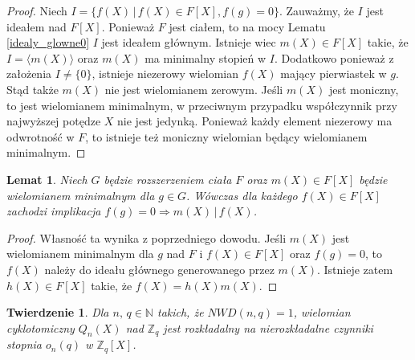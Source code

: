 \documentclass[declaration,shortabstract]{iithesis}
\theoremstyle{definition}
\theoremstyle{remark} \newtheorem{observation}{Obserwacja}
\theoremstyle{plain} \newtheorem{theorem}{Twierdzenie}
\theoremstyle{plain} \newtheorem{lemma}{Lemat}
\theoremstyle{remark} \newtheorem*{remark*}{Uwaga}
\theoremstyle{reminder} \newtheorem*{reminder*}{Przypomnienie}
\begin{document}
\begin{proof}
	Niech $I = \{f(X) \, | \, f(X) \in F[X], f(g) = 0\}$. Zauważmy, że $I$ jest ideałem nad $F[X]$. Ponieważ $F$ jest ciałem, to na mocy Lematu \ref{idealy_glowne0} $I$ jest ideałem głównym. Istnieje wiec $m(X) \in F[X]$ takie, że $I = \langle m(X) \rangle$ oraz $m(X)$ ma minimalny stopień w $I$. Dodatkowo ponieważ z założenia $I \neq \{0\}$, istnieje niezerowy wielomian $f(X)$ mający pierwiastek w $g$. Stąd także $m(X)$ nie jest wielomianem zerowym. Jeśli $m(X)$ jest moniczny, to jest wielomianem minimalnym, w przeciwnym przypadku współczynnik przy najwyższej potędze $X$ nie jest jedynką. Ponieważ każdy element niezerowy ma odwrotność w $F$, to istnieje też moniczny wielomian będący wielomianem minimalnym.
\end{proof}
	
\begin{lemma} \label{mini_dzieli}
	Niech $G$ będzie rozszerzeniem ciała $F$ oraz $m(X) \in F[X]$ będzie wielomianem minimalnym dla $g \in G$. Wówczas dla każdego  $f(X) \in F[X]$ zachodzi implikacja $f(g) = 0 \Rightarrow m(X) \, | \, f(X)$.
\end{lemma}
	
\begin{proof}
	Własność ta wynika z poprzedniego dowodu. Jeśli $m(X)$ jest wielomianem minimalnym dla $g$ nad $F$ i $f(X) \in F[X]$ oraz $f(g) = 0$, to $f(X)$ należy do ideału głównego generowanego przez $m(X)$. Istnieje zatem $h(X) \in F[X]$ takie, że $f(X) = h(X)m(X)$.
\end{proof}
	
\begin{theorem} \label{kluczowe}
	Dla $n, \, q \in \mathbb{N}$ takich, że $NWD(n, q) = 1$, wielomian cyklotomiczny $Q_n(X)$ nad $\mathbb{Z}_q$ jest rozkładalny na nierozkładalne czynniki stopnia $o_n(q)$ w $\mathbb{Z}_q[X]$.
\end{theorem}
	
\end{document}
